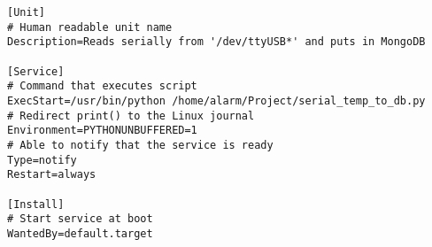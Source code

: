 \begin{lstlisting}[caption={The systemd service managing data collection}, label={systemd}]
[Unit]
# Human readable unit name
Description=Reads serially from '/dev/ttyUSB*' and puts in MongoDB

[Service]
# Command that executes script
ExecStart=/usr/bin/python /home/alarm/Project/serial_temp_to_db.py
# Redirect print() to the Linux journal
Environment=PYTHONUNBUFFERED=1
# Able to notify that the service is ready
Type=notify
Restart=always

[Install]
# Start service at boot
WantedBy=default.target
\end{lstlisting}
